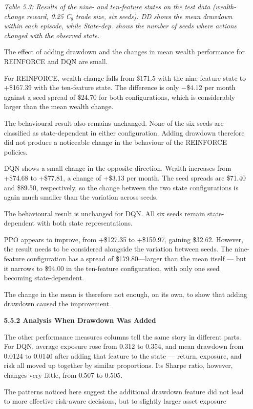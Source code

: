 \emph{Table 5.3: Results of the nine- and ten-feature states on the test
data (wealth-change reward, 0.25 C₀ trade size, six seeds). DD shows the
mean drawdown within each episode, while State-dep. shows the number of
seeds where actions changed with the observed state.}

The effect of adding drawdown and the changes in mean wealth performance
for REINFORCE and DQN are small.

For REINFORCE, wealth change falls from \$171.5 with the nine-feature
state to +\$167.39 with the ten-feature state. The difference is only
−\$4.12 per month against a seed spread of \$24.70 for both
configurations, which is considerably larger than the mean wealth
change.

The behavioural result also remains unchanged. None of the six seeds are
classified as state-dependent in either configuration. Adding drawdown
therefore did not produce a noticeable change in the behaviour of the
REINFORCE policies.

DQN shows a small change in the opposite direction. Wealth increases
from +\$74.68 to +\$77.81, a change of +\$3.13 per month. The seed
spreads are \$71.40 and \$89.50, respectively, so the change between the
two state configurations is again much smaller than the variation across
seeds.

The behavioural result is unchanged for DQN. All six seeds remain
state-dependent with both state representations.

PPO appears to improve, from +\$127.35 to +\$159.97, gaining \$32.62.
However, the result needs to be considered alongside the variation
between seeds. The nine-feature configuration has a spread of
\$179.80---larger than the mean itself --- but it narrows to \$94.00 in
the ten-feature configuration, with only one seed becoming
state-dependent.

The change in the mean is therefore not enough, on its own, to show that
adding drawdown caused the improvement.

\textbf{5.5.2 Analysis When Drawdown Was Added}

The other performance measures columns tell the same story in different
parts. For DQN, average exposure rose from 0.312 to 0.354, and mean
drawdown from 0.0124 to 0.0140 after adding that feature to the state
--- return, exposure, and risk all moved up together by similar
proportions. Its Sharpe ratio, however, changes very little, from 0.507
to 0.505.

The patterns noticed here suggest the additional drawdown feature did
not lead to more effective risk-aware decisions, but to slightly larger
asset exposure

